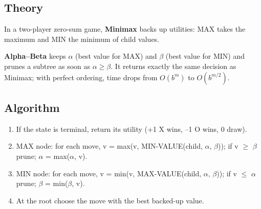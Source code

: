 \documentclass[11pt]{article}
\begin{document}
\subsection*{Theory}
In a two-player zero-sum game, \textbf{Minimax} backs up utilities: MAX takes the maximum and MIN the minimum of child values.

\textbf{Alpha--Beta} keeps $\alpha$ (best value for MAX) and $\beta$ (best value for MIN) and prunes a subtree as soon as $\alpha\ge\beta$. It returns exactly the same decision as Minimax; with perfect ordering, time drops from $O(b^m)$ to $O(b^{m/2})$.
\subsection*{Algorithm}
\begin{algo}[Procedure]\begin{enumerate}
\item If the state is terminal, return its utility (+1 X wins, --1 O wins, 0 draw).
\item MAX node: for each move, v = max(v, MIN-VALUE(child, $\alpha$, $\beta$)); if v $\ge$ $\beta$ prune; $\alpha$ = max($\alpha$, v).
\item MIN node: for each move, v = min(v, MAX-VALUE(child, $\alpha$, $\beta$)); if v $\le$ $\alpha$ prune; $\beta$ = min($\beta$, v).
\item At the root choose the move with the best backed-up value.
\end{enumerate}\end{algo}
\end{document}
